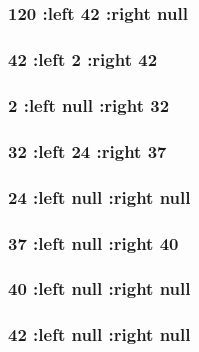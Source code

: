 \documentclass[11pt]{article}
\begin{document}
\subsection{}
\label{sec:orgcdbc5ce}
\subsubsection{120 :left 42 :right null}
\label{sec:org87f0d6e}
\subsubsection{42 :left 2 :right 42}
\label{sec:org7c29cab}
\subsubsection{2 :left null :right 32}
\label{sec:org799900b}
\subsubsection{32 :left 24 :right 37}
\label{sec:orgc69de1c}
\subsubsection{24 :left null :right null}
\label{sec:org22d4eb5}
\subsubsection{37 :left null :right 40}
\label{sec:org746dccd}
\subsubsection{40 :left null :right null}
\label{sec:org363f540}
\subsubsection{42 :left null :right null}
\label{sec:org52b916f}
\end{document}
